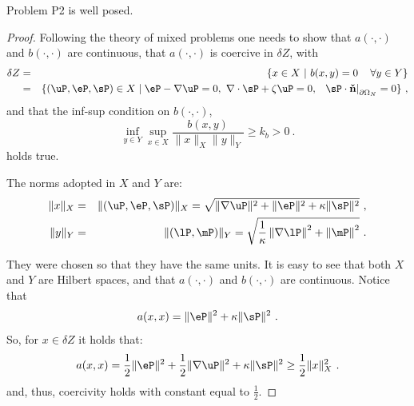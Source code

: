 \begin{theorem}
\label{theorem1}
	Problem P2 is well posed.
	
	\begin{proof}
		Following the theory of mixed problems \cite{brezzi-fortin,ern-guermond} one needs to show that $a(\cdot,\cdot)$ and $b(\cdot,\cdot)$ are continuous, that $a(\cdot,\cdot)$ is coercive in $\delta Z$, with
		\begin{eqnarray}
			\delta Z&=&\{x\in X~|~b(x,y)=0\, \quad \forall y\in Y\}\nonumber \\
			&=&\{(\uP,\eP,\sP)\in X \mid \eP-\nabla \uP=0, ~\nabla \cdot \sP + \zeta \uP =0,~\left. ~\sP \cdot \mathbf{\check{n}}\right |_{\partial\Omega_N} = 0  \}~,
		\end{eqnarray}
		and that the inf-sup condition on $b(\cdot,\cdot)$,
		\begin{equation}
			\inf_{y\in Y}\sup_{x\in X} \frac{b(x,y)}{\|x\|_X\|y\|_Y} \geq k_b > 0~.
		\label{eqinfsup}
		\end{equation}
		holds true.
		
		The norms adopted in $X$ and $Y$ are: 
		\begin{eqnarray}
			\|x\|_X &=& \|(\uP,\eP,\sP)\|_X = \sqrt{\|\nabla \uP\|^2+\|\eP\|^2+\kappa \|\sP\|^2}~,\\
			\|y\|_Y &=& \|(\lP,\mP)\|_Y=\sqrt{\frac{1}{\kappa}\left \| \nabla \lP \right \|^2+\left\|\mP \right \|^2}~.
		\end{eqnarray}
		
		They were chosen so that they have the same units. It is easy to see that both $X$ and $Y$ are Hilbert spaces, and that $a(\cdot,\cdot)$ and $b(\cdot,\cdot)$ are continuous. Notice that
		\begin{equation*}
				a(x,x)=\|\eP\|^2 + \kappa \|\sP\|^2 ~.
		\end{equation*}
		So, for $x \in \delta Z$ it holds that:
		\begin{equation}
			a(x,x)= \frac12 \|\eP\|^2 +\frac12 \|\nabla \uP\|^2+ \kappa \|\sP\|^2 \geq \frac12 \|x\|_X^2~.
		\label{eqcoercivity}
		\end{equation}
		and, thus, coercivity holds with constant equal to $\frac12$.
		

\end{proof}
\end{theorem}
